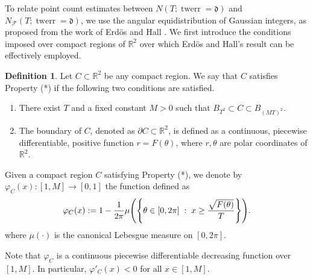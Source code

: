 \documentclass[12pt]{amsart}
\numberwithin{equation}{section} %
\theoremstyle{definition} \newtheorem{definition}[counter]{Definition}
\theoremstyle{remark} \newtheorem{nonexam}[counter]{Non-example}
\newcommand{\FF}{\mathscr{F}} %
\let\originalleft\left \let\originalright\right
\renewcommand{\left}{\mathopen{}\mathclose\bgroup\originalleft}
\renewcommand{\right}{\aftergroup\egroup\originalright}
\DeclareMathOperator{\twerr}{twerr} %
\begin{document}
To relate point count estimates between $N(T; \twerr = \mathfrak{d})$ and $N_{\FF}(T; \twerr = \mathfrak{d})$, we use the angular equidistribution of Gaussian integers, as proposed from the work of Erd\"os and Hall \cite{EH99}. We first introduce the conditions imposed over compact regions of $\mathbb{R}^2$ over which Erd\"os and Hall's result can be effectively employed.
\begin{definition} \label{def:Property*}
    Let $C \subset \mathbb{R}^2$ be any compact region. We say that $C$ satisfies Property (*) if the following two conditions are satisfied.
    \begin{enumerate}
        \item There exist $T$ and a fixed constant $M > 0$ such that $B_{T^2} \subset C \subset B_{(M T)^2}$.
        \item The boundary of $C$, denoted as $\partial C \subset \mathbb{R}^2$, is defined as a continuous, piecewise differentiable, positive function $r = F(\theta)$, where $r, \theta$ are polar coordinates of $\mathbb{R}^2$.
    \end{enumerate}
    Given a compact region $C$ satisfying Property (*), we denote by $\varphi_C(x): [1,M] \to [0,1]$ the function defined as
    \begin{equation}
        \varphi_C(x) := 1 - \frac{1}{2\pi} \mu \left( \left\{ \theta \in [0,2\pi] \; : \; x \geq \frac{\sqrt{F(\theta)}}{T}\right\} \right).
    \end{equation}
    where $\mu(\cdot)$ is the canonical Lebesgue measure on $[0,2\pi]$.
\end{definition}
Note that $\varphi_C$ is a continuous piecewise differentiable decreasing function over $[1,M]$. In particular, $\varphi'_C(x) < 0$ for all $x \in [1,M]$.
\end{document}
